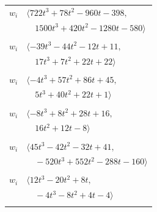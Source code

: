 \documentclass[11pt]{article}
\begin{document}
\begin{longtable}{@{}ll@{}}
$w_i$ & $\langle 722t^{3}+78t^{2}-960t-398,$\\
 & $\quad 1500t^{3}+420t^{2}-1280t-580\rangle$\\
\addlinespace[2pt]
\multicolumn{2}{@{}p{0.97\textwidth}@{}}{$i=18$, $D_i=4$, $\rho_{ij}$: $2{:}2, \allowbreak 5{:}2, \allowbreak 11{:}2, \allowbreak 13{:}1, \allowbreak 19{:}2, \allowbreak 23{:}2, \allowbreak 24{:}1, \allowbreak 26{:}1, \allowbreak 30{:}2$}\\
$w_i$ & $\langle -39t^{3}-44t^{2}-12t+11,$\\
 & $\quad 17t^{3}+7t^{2}+22t+22\rangle$\\
\addlinespace[2pt]
\multicolumn{2}{@{}p{0.97\textwidth}@{}}{$i=19$, $D_i=8$, $\rho_{ij}$: $2{:}1, \allowbreak 5{:}2, \allowbreak 6{:}2, \allowbreak 7{:}2, \allowbreak 8{:}1, \allowbreak 17{:}1, \allowbreak 18{:}1, \allowbreak 21{:}2$}\\
$w_i$ & $\langle -4t^{3}+57t^{2}+86t+45,$\\
 & $\quad 5t^{3}+40t^{2}+22t+1\rangle$\\
\addlinespace[2pt]
\multicolumn{2}{@{}p{0.97\textwidth}@{}}{$i=20$, $D_i=6$, $\rho_{ij}$: $4{:}2, \allowbreak 6{:}2, \allowbreak 11{:}1, \allowbreak 17{:}1, \allowbreak 21{:}2$}\\
$w_i$ & $\langle -8t^{3}+8t^{2}+28t+16,$\\
 & $\quad 16t^{2}+12t-8\rangle$\\
\addlinespace[2pt]
\multicolumn{2}{@{}p{0.97\textwidth}@{}}{$i=21$, $D_i=8$, $\rho_{ij}$: $2{:}2, \allowbreak 3{:}1, \allowbreak 4{:}2, \allowbreak 8{:}1, \allowbreak 9{:}2, \allowbreak 11{:}1, \allowbreak 13{:}1, \allowbreak 14{:}1, \allowbreak 16{:}1, \allowbreak 17{:}2, \allowbreak 19{:}1, \allowbreak 20{:}1, \allowbreak 26{:}2, \allowbreak 31{:}1$}\\
$w_i$ & $\langle 45t^{3}-42t^{2}-32t+41,$\\
 & $\quad -520t^{3}+552t^{2}-288t-160\rangle$\\
\addlinespace[2pt]
\multicolumn{2}{@{}p{0.97\textwidth}@{}}{$i=22$, $D_i=2$, $\rho_{ij}$: $1{:}1, \allowbreak 4{:}2, \allowbreak 7{:}1, \allowbreak 8{:}1, \allowbreak 13{:}1, \allowbreak 14{:}2, \allowbreak 15{:}1, \allowbreak 17{:}1, \allowbreak 28{:}2$}\\
$w_i$ & $\langle 12t^{3}-20t^{2}+8t,$\\
 & $\quad -4t^{3}-8t^{2}+4t-4\rangle$\\
\addlinespace[2pt]
\multicolumn{2}{@{}p{0.97\textwidth}@{}}{$i=23$, $D_i=52$, $\rho_{ij}$: $3{:}2, \allowbreak 4{:}2, \allowbreak 5{:}1, \allowbreak 12{:}2, \allowbreak 18{:}1, \allowbreak 26{:}2, \allowbreak 28{:}2$}\\

\end{longtable}
\end{document}
